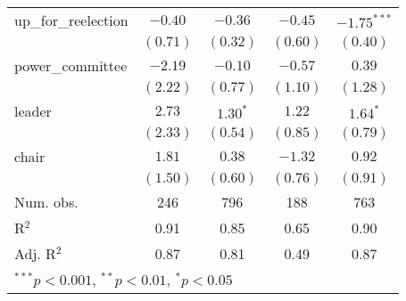 \documentclass[12pt]{article}
\begin{document}
\begin{table}[H]
\begin{center}
\begin{tabular}{l c c c c }
			up\_for\_reelection     & $-0.40$       & $-0.36$      & $-0.45$  & $-1.75^{***}$ \\
			& $(0.71)$      & $(0.32)$     & $(0.60)$ & $(0.40)$      \\
			power\_committee        & $-2.19$       & $-0.10$      & $-0.57$  & $0.39$        \\
			& $(2.22)$      & $(0.77)$     & $(1.10)$ & $(1.28)$      \\
			leader                  & $2.73$        & $1.30^{*}$   & $1.22$   & $1.64^{*}$    \\
			& $(2.33)$      & $(0.54)$     & $(0.85)$ & $(0.79)$      \\
			chair                   & $1.81$        & $0.38$       & $-1.32$  & $0.92$        \\
			& $(1.50)$      & $(0.60)$     & $(0.76)$ & $(0.91)$      \\
			\hline
			Num. obs.               & 246           & 796          & 188      & 763           \\
			R$^2$     & 0.91          & 0.85         & 0.65     & 0.90          \\
			Adj. R$^2$ & 0.87          & 0.81         & 0.49     & 0.87          \\
			\hline
			\multicolumn{5}{l}{\scriptsize{$^{***}p<0.001$, $^{**}p<0.01$, $^*p<0.05$}}
		\end{tabular}
	\end{center}
\end{table}
\end{document}
